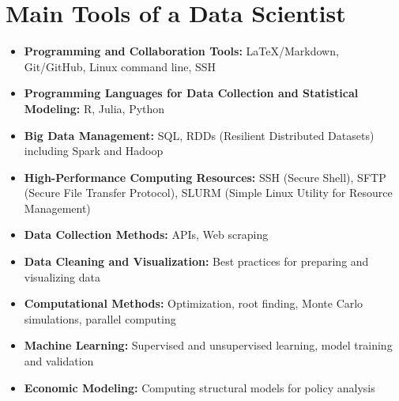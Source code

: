 \documentclass{article}
\begin{document}
\section*{Main Tools of a Data Scientist}

\begin{itemize}
    \item \textbf{Programming and Collaboration Tools:} LaTeX/Markdown, Git/GitHub, Linux command line, SSH
    
    \item \textbf{Programming Languages for Data Collection and Statistical Modeling:} R, Julia, Python
    
    \item \textbf{Big Data Management:} SQL, RDDs (Resilient Distributed Datasets) including Spark and Hadoop
    
    \item \textbf{High-Performance Computing Resources:} SSH (Secure Shell), SFTP (Secure File Transfer Protocol), SLURM (Simple Linux Utility for Resource Management)
    
    \item \textbf{Data Collection Methods:} APIs, Web scraping
    
    \item \textbf{Data Cleaning and Visualization:} Best practices for preparing and visualizing data
    
    \item \textbf{Computational Methods:} Optimization, root finding, Monte Carlo simulations, parallel computing
    
    \item \textbf{Machine Learning:} Supervised and unsupervised learning, model training and validation
    
    \item \textbf{Economic Modeling:} Computing structural models for policy analysis
\end{itemize}
\end{document}
